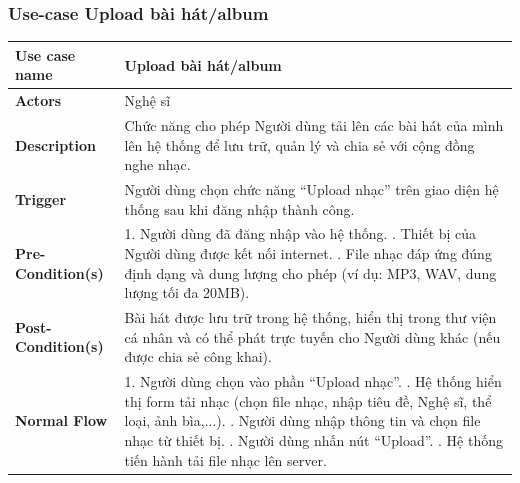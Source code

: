 \documentclass[a4paper]{article}
\begin{document}
\subsubsection{Use-case Upload bài hát/album}
\begin{table}[H]
	\centering
	\renewcommand{\arraystretch}{1.3} %
	\begin{tabularx}{\textwidth}{|l|X|}
		\hline
		\textbf{Use case name} & Upload bài hát/album                                                                                                                             \\ \hline
		\textbf{Actors}        & Nghệ sĩ                                                                                                                                          \\ \hline
		\textbf{Description}   & Chức năng cho phép Người dùng tải lên các bài hát của mình lên hệ thống để lưu trữ, quản lý và chia sẻ với cộng đồng nghe nhạc.                  \\ \hline
		\textbf{Trigger}       & Người dùng chọn chức năng “Upload nhạc” trên giao diện hệ thống sau khi đăng nhập thành công.                                                    \\ \hline
		\textbf{Pre-Condition(s)}
		                       & 1. Người dùng đã đăng nhập vào hệ thống. \newline
		2. Thiết bị của Người dùng được kết nối internet. \newline
		3. File nhạc đáp ứng đúng định dạng và dung lượng cho phép (ví dụ: MP3, WAV, dung lượng tối đa 20MB).                                                                     \\ \hline
		\textbf{Post-Condition(s)}
		                       & Bài hát được lưu trữ trong hệ thống, hiển thị trong thư viện cá nhân và có thể phát trực tuyến cho Người dùng khác (nếu được chia sẻ công khai). \\ \hline
		\textbf{Normal Flow}
		                       & 1. Người dùng chọn vào phần “Upload nhạc”. \newline
		2. Hệ thống hiển thị form tải nhạc (chọn file nhạc, nhập tiêu đề, Nghệ sĩ, thể loại, ảnh bìa,...). \newline
		3. Người dùng nhập thông tin và chọn file nhạc từ thiết bị. \newline
		4. Người dùng nhấn nút “Upload”. \newline
		5. Hệ thống tiến hành tải file nhạc lên server. \newline

\end{tabularx}
\end{table}
\end{document}
